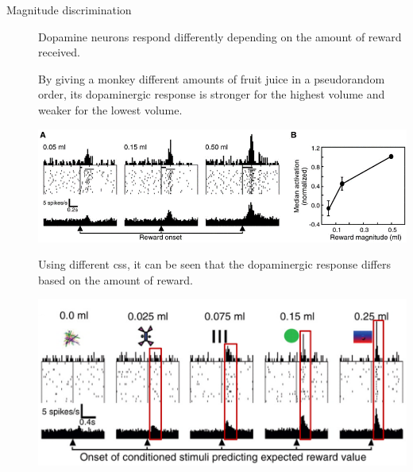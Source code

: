 \begin{description}
    \item[Magnitude discrimination] 
        Dopamine neurons respond differently depending on the amount of reward received.

        \begin{@empty}
            \small
            \begin{example}
                By giving a monkey different amounts of fruit juice in a pseudorandom order,
                its dopaminergic response is stronger for the highest volume and weaker for the lowest volume.
                \begin{center}
                    \includegraphics[width=0.7\linewidth]{./img/dopamine_monkey3.png}    
                \end{center}
            \end{example}
        \end{@empty}

        \begin{@empty}
            \small
            \begin{example}
                Using different \acp{cs}, it can be seen that the dopaminergic response differs based on the amount of reward.
                \begin{center}
                    \includegraphics[width=0.55\linewidth]{./img/dopamine_expected.png}
                \end{center}
            \end{example}
        \end{@empty}


\end{description}
